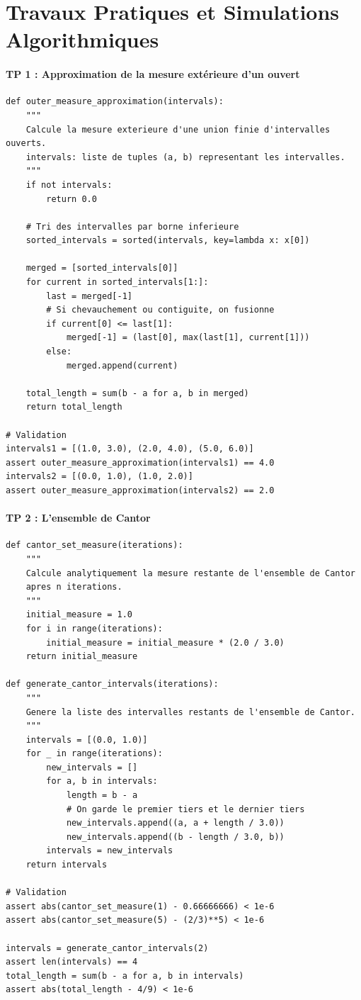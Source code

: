\documentclass[11pt,a4paper]{article}
\begin{document}
\newpage
\part{Travaux Pratiques et Simulations Algorithmiques}
\subsection*{TP 1 : Approximation de la mesure extérieure d'un ouvert}

\begin{lstlisting}
def outer_measure_approximation(intervals):
    """
    Calcule la mesure exterieure d'une union finie d'intervalles ouverts.
    intervals: liste de tuples (a, b) representant les intervalles.
    """
    if not intervals:
        return 0.0

    # Tri des intervalles par borne inferieure
    sorted_intervals = sorted(intervals, key=lambda x: x[0])

    merged = [sorted_intervals[0]]
    for current in sorted_intervals[1:]:
        last = merged[-1]
        # Si chevauchement ou contiguite, on fusionne
        if current[0] <= last[1]:
            merged[-1] = (last[0], max(last[1], current[1]))
        else:
            merged.append(current)

    total_length = sum(b - a for a, b in merged)
    return total_length

# Validation
intervals1 = [(1.0, 3.0), (2.0, 4.0), (5.0, 6.0)]
assert outer_measure_approximation(intervals1) == 4.0
intervals2 = [(0.0, 1.0), (1.0, 2.0)]
assert outer_measure_approximation(intervals2) == 2.0
\end{lstlisting}

\newpage
\subsection*{TP 2 : L'ensemble de Cantor}

\begin{lstlisting}
def cantor_set_measure(iterations):
    """
    Calcule analytiquement la mesure restante de l'ensemble de Cantor
    apres n iterations.
    """
    initial_measure = 1.0
    for i in range(iterations):
        initial_measure = initial_measure * (2.0 / 3.0)
    return initial_measure

def generate_cantor_intervals(iterations):
    """
    Genere la liste des intervalles restants de l'ensemble de Cantor.
    """
    intervals = [(0.0, 1.0)]
    for _ in range(iterations):
        new_intervals = []
        for a, b in intervals:
            length = b - a
            # On garde le premier tiers et le dernier tiers
            new_intervals.append((a, a + length / 3.0))
            new_intervals.append((b - length / 3.0, b))
        intervals = new_intervals
    return intervals

# Validation
assert abs(cantor_set_measure(1) - 0.66666666) < 1e-6
assert abs(cantor_set_measure(5) - (2/3)**5) < 1e-6

intervals = generate_cantor_intervals(2)
assert len(intervals) == 4
total_length = sum(b - a for a, b in intervals)
assert abs(total_length - 4/9) < 1e-6
\end{lstlisting}
\end{document}

